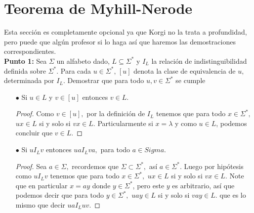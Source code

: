 \section{Teorema de Myhill-Nerode}

Esta sección es completamente opcional ya que Korgi no la trata a profundidad, pero puede que algún profesor si lo haga así que haremos las demostraciones correspondientes.\\

\textbf{Punto 1: }Sea $\Sigma$ un alfabeto dado, $L\subseteq\Sigma^*$ y $I_L$ la relación de indistinguibilidad definida sobre $\Sigma^*.$ Para cada $u\in\Sigma^*,\,[u]$ denota la clase de equivalencia de $u,$ determinada por $I_L.$ Demostrar que para todo $u,v\in\Sigma^*$ se cumple
\begin{itemize}
    \item[$\bullet$] Si $u\in L$ y $v\in[u]$ entonces $v\in L.$
    \begin{proof}
        Como $v\in[u],$ por la definición de $I_L$ tenemos que para todo $x\in\Sigma^*,$ $ux\in L$ si y solo si $vx\in L.$ Particularmente si $x=\lambda$ y como $u\in L$, podemos concluir que $v\in L.$ 
    \end{proof}
    \item[$\bullet$] Si $uI_Lv$ entonces $uaI_Lva,$ para todo $a\in Sigma.$
    \begin{proof}
        Sea $a\in\Sigma,$ recordemos que $\Sigma\subset\Sigma^*,$ así $a\in\Sigma^*.$ Luego por hipótesis como $uI_Lv$ tenemos que para todo $x\in\Sigma^*,$ $ux\in L$ si y solo si $vx\in L.$ Note que en particular $x=ay$ donde $y\in\Sigma^*$, pero este $y$ es arbitrario, así que podemos decir que para todo $y\in\Sigma^*,$ $uay\in L$ si y solo si $vay\in L.$ que es lo mismo que decir $uaI_Luv.$
    \end{proof}
\end{itemize}

